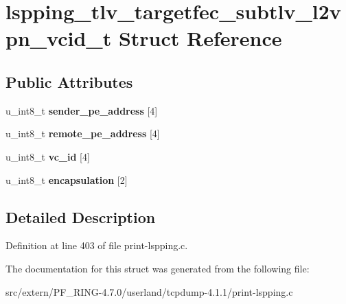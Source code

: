 \hypertarget{structlspping__tlv__targetfec__subtlv__l2vpn__vcid__t}{
\section{lspping\_\-tlv\_\-targetfec\_\-subtlv\_\-l2vpn\_\-vcid\_\-t Struct Reference}
\label{structlspping__tlv__targetfec__subtlv__l2vpn__vcid__t}
}
\subsection*{Public Attributes}
\begin{DoxyCompactItemize}
\item 
\hypertarget{structlspping__tlv__targetfec__subtlv__l2vpn__vcid__t_a4ba9f967cc60901ae8639c3bf02ac049}{
u\_\-int8\_\-t {\bfseries sender\_\-pe\_\-address} \mbox{[}4\mbox{]}}
\label{structlspping__tlv__targetfec__subtlv__l2vpn__vcid__t_a4ba9f967cc60901ae8639c3bf02ac049}

\item 
\hypertarget{structlspping__tlv__targetfec__subtlv__l2vpn__vcid__t_a01df86f75e326b1a1de3eddb24008429}{
u\_\-int8\_\-t {\bfseries remote\_\-pe\_\-address} \mbox{[}4\mbox{]}}
\label{structlspping__tlv__targetfec__subtlv__l2vpn__vcid__t_a01df86f75e326b1a1de3eddb24008429}

\item 
\hypertarget{structlspping__tlv__targetfec__subtlv__l2vpn__vcid__t_a31a48760e77333a49583b09e6e7ffab1}{
u\_\-int8\_\-t {\bfseries vc\_\-id} \mbox{[}4\mbox{]}}
\label{structlspping__tlv__targetfec__subtlv__l2vpn__vcid__t_a31a48760e77333a49583b09e6e7ffab1}

\item 
\hypertarget{structlspping__tlv__targetfec__subtlv__l2vpn__vcid__t_ac06e783981b671510f180d0823eead84}{
u\_\-int8\_\-t {\bfseries encapsulation} \mbox{[}2\mbox{]}}
\label{structlspping__tlv__targetfec__subtlv__l2vpn__vcid__t_ac06e783981b671510f180d0823eead84}

\end{DoxyCompactItemize}


\subsection{Detailed Description}


Definition at line 403 of file print-\/lspping.c.



The documentation for this struct was generated from the following file:\begin{DoxyCompactItemize}
\item 
src/extern/PF\_\-RING-\/4.7.0/userland/tcpdump-\/4.1.1/print-\/lspping.c\end{DoxyCompactItemize}
